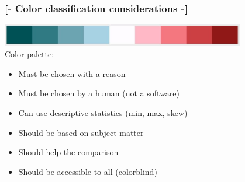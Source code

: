 \documentclass[xcolor=x11names,aspectratio=169, compress]{beamer}
\renewcommand{\(}{\begin{columns}}
\renewcommand{\)}{\end{columns}}
\newcommand{\<}[1]{\begin{column}{#1}}
\renewcommand{\>}{\end{column}}
\begin{document}
\begin{frame}
\begin{center}
\begin{itemize}

    \end{itemize}
\end{center}
\end{frame}

\begin{frame} %
\frametitle{\textcolor{brique}{[-  \textbf{Color classification considerations} -]}}
{\centering
\includegraphics[width = 0.8\textwidth]{M5-ColorBlindPalette.JPG}
} \\
Color palette: \\
\vspace{0.5cm}
\begin{itemize}[<+-|alert@+>]
    \item  Must be chosen with a reason
    \item  Must be chosen  by a human (not a software)
    \item  Can use descriptive statistics (min, max, skew)
    \item  Should be based on subject matter
    \item  Should help the comparison
    \item  Should be accessible to all (colorblind)
\end{itemize}
\end{frame}
\end{document}
